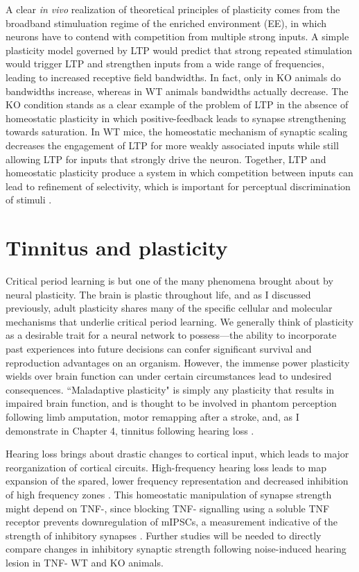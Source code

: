 A clear \textit{in vivo} realization of theoretical principles of plasticity comes from the broadband stimuluation regime of the enriched environment (EE), in which neurons have to contend with competition from multiple strong inputs. A simple plasticity model governed by LTP would predict that strong repeated stimulation would trigger LTP and strengthen inputs from a wide range of frequencies, leading to increased receptive field bandwidths. In fact, only in KO animals do bandwidths increase, whereas in WT animals bandwidths actually decrease. The KO condition stands as a clear example of the problem of LTP in the absence of homeostatic plasticity in which positive-feedback leads to synapse strengthening towards saturation. In WT mice, the homeostatic mechanism of synaptic scaling decreases the engagement of LTP for more weakly associated inputs while still allowing LTP for inputs that strongly drive the neuron. Together, LTP and homeostatic plasticity produce a system in which competition between inputs can lead to refinement of selectivity, which is important for perceptual discrimination of stimuli \cite{Han2007}.

\section{Tinnitus and plasticity}

Critical period learning is but one of the many phenomena brought about by neural plasticity. The brain is plastic throughout life, and as I discussed previously, adult plasticity shares many of the specific cellular and molecular mechanisms that underlie critical period learning. We generally think of plasticity as a desirable trait for a neural network to possess---the ability to incorporate past experiences into future decisions can confer significant survival and reproduction advantages on an organism. However, the immense power plasticity wields over brain function can under certain circumstances lead to undesired consequences. ``Maladaptive plasticity" is simply any plasticity that results in impaired brain function, and is thought to be involved in phantom perception following limb amputation, motor remapping after a stroke, and, as I demonstrate in Chapter 4, tinnitus following hearing loss \cite{Flor2006, Takeuchi2012}.

Hearing loss brings about drastic changes to cortical input, which leads to major reorganization of cortical circuits. High-frequency hearing loss leads to map expansion of the spared, lower frequency representation and decreased inhibition of high frequency zones \cite{Yang2013}. This homeostatic manipulation of synapse strength might depend on TNF-\textalpha{}, since blocking TNF-\textalpha{} signalling using a soluble TNF receptor prevents downregulation of mIPSCs, a measurement indicative of the strength of inhibitory synapses \cite{Stellwagen2006}. Further studies will be needed to directly compare changes in inhibitory synaptic strength following noise-induced hearing lesion in TNF-\textalpha{} WT and KO animals.

